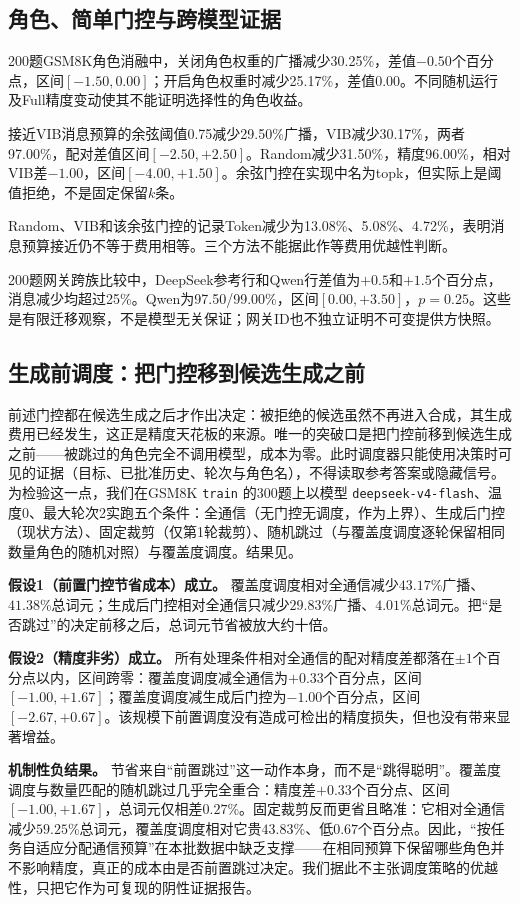 \documentclass[11pt,a4paper]{article}
\begin{document}
\subsection{角色、简单门控与跨模型证据}
200题GSM8K角色消融中，关闭角色权重的广播减少30.25\%，差值$-0.50$个百分点，区间$[-1.50,0.00]$；开启角色权重时减少25.17\%，差值0.00。不同随机运行及Full精度变动使其不能证明选择性的角色收益。

接近VIB消息预算的余弦阈值0.75减少29.50\%广播，VIB减少30.17\%，两者97.00\%，配对差值区间$[-2.50,+2.50]$。Random减少31.50\%，精度96.00\%，相对VIB差$-1.00$，区间$[-4.00,+1.50]$。余弦门控在实现中名为topk，但实际上是阈值拒绝，不是固定保留$k$条。

Random、VIB和该余弦门控的记录Token减少为13.08\%、5.08\%、4.72\%，表明消息预算接近仍不等于费用相等。三个方法不能据此作等费用优越性判断。

200题网关跨族比较中，DeepSeek参考行和Qwen行差值为$+0.5$和$+1.5$个百分点，消息减少均超过25\%。Qwen为97.50/99.00\%，区间$[0.00,+3.50]$，$p=0.25$。这些是有限迁移观察，不是模型无关保证；网关ID也不独立证明不可变提供方快照。

\subsection{生成前调度：把门控移到候选生成之前}
前述门控都在候选生成之后才作出决定：被拒绝的候选虽然不再进入合成，其生成费用已经发生，这正是精度天花板的来源。唯一的突破口是把门控前移到候选生成之前——被跳过的角色完全不调用模型，成本为零。此时调度器只能使用决策时可见的证据（目标、已批准历史、轮次与角色名），不得读取参考答案或隐藏信号。为检验这一点，我们在GSM8K \texttt{train} 的300题上以模型 \texttt{deepseek-v4-flash}、温度0、最大轮次2实跑五个条件：全通信（无门控无调度，作为上界）、生成后门控（现状方法）、固定裁剪（仅第1轮裁剪）、随机跳过（与覆盖度调度逐轮保留相同数量角色的随机对照）与覆盖度调度。结果见。

\textbf{假设1（前置门控节省成本）成立。} 覆盖度调度相对全通信减少$43.17$\%广播、$41.38$\%总词元；生成后门控相对全通信只减少$29.83$\%广播、$4.01$\%总词元。把“是否跳过”的决定前移之后，总词元节省被放大约十倍。

\textbf{假设2（精度非劣）成立。} 所有处理条件相对全通信的配对精度差都落在$\pm1$个百分点以内，区间跨零：覆盖度调度减全通信为$+0.33$个百分点，区间$[-1.00,+1.67]$；覆盖度调度减生成后门控为$-1.00$个百分点，区间$[-2.67,+0.67]$。该规模下前置调度没有造成可检出的精度损失，但也没有带来显著增益。

\textbf{机制性负结果。} 节省来自“前置跳过”这一动作本身，而不是“跳得聪明”。覆盖度调度与数量匹配的随机跳过几乎完全重合：精度差$+0.33$个百分点、区间$[-1.00,+1.67]$，总词元仅相差$0.27$\%。固定裁剪反而更省且略准：它相对全通信减少$59.25$\%总词元，覆盖度调度相对它贵$43.83$\%、低$0.67$个百分点。因此，“按任务自适应分配通信预算”在本批数据中缺乏支撑——在相同预算下保留哪些角色并不影响精度，真正的成本由是否前置跳过决定。我们据此不主张调度策略的优越性，只把它作为可复现的阴性证据报告。
\end{document}
